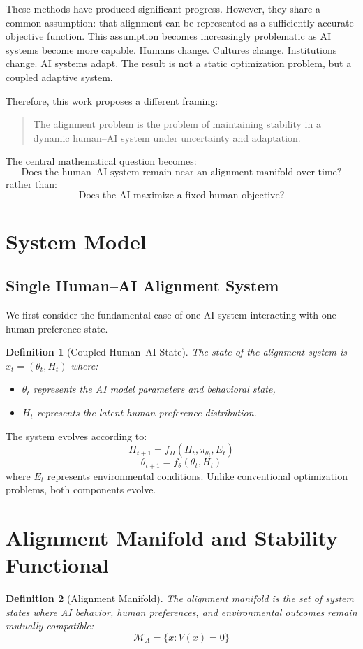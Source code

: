 \documentclass[11pt]{article}
\newtheorem{definition}{Definition}
\begin{document}
These methods have produced significant progress. However, they share a common assumption: that alignment can be represented as a sufficiently accurate objective function. This assumption becomes increasingly problematic as AI systems become more capable. Humans change. Cultures change. Institutions change. AI systems adapt. The result is not a static optimization problem, but a coupled adaptive system.

Therefore, this work proposes a different framing:
\begin{quote}
The alignment problem is the problem of maintaining stability in a dynamic human--AI system under uncertainty and adaptation.
\end{quote}

The central mathematical question becomes:
\[
\text{Does the human--AI system remain near an alignment manifold over time?}
\]
rather than:
\[
\text{Does the AI maximize a fixed human objective?}
\]

\section{System Model}
\subsection{Single Human--AI Alignment System}
We first consider the fundamental case of one AI system interacting with one human preference state.

\begin{definition}[Coupled Human--AI State]
The state of the alignment system is $x_t=(\theta_t,H_t)$ where:
\begin{itemize}
\item $\theta_t$ represents the AI model parameters and behavioral state,
\item $H_t$ represents the latent human preference distribution.
\end{itemize}
\end{definition}

The system evolves according to:
\[
H_{t+1} = f_H(H_t,\pi_{\theta_t},E_t)
\]
\[
\theta_{t+1} = f_\theta(\theta_t,H_t)
\]
where $E_t$ represents environmental conditions. Unlike conventional optimization problems, both components evolve.

\section{Alignment Manifold and Stability Functional}
\begin{definition}[Alignment Manifold]
The alignment manifold is the set of system states where AI behavior, human preferences, and environmental outcomes remain mutually compatible:
\[
\mathcal{M}_A = \{x:V(x)=0\}
\]
\end{definition}
\end{document}
